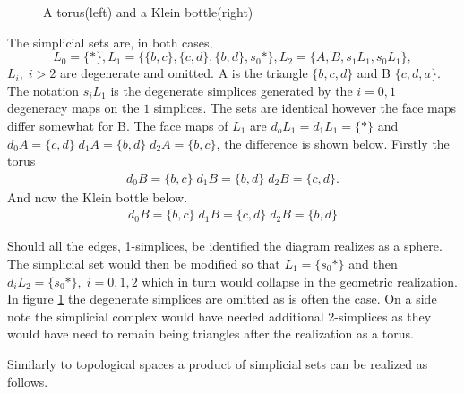\documentclass[../../main.tex]{subfiles}
\begin{document}
\begin{example}
\begin{figure}[H]
\begin{subfigure}[b]{0.3\textwidth}
        \end{subfigure}
        \caption{A torus(left) and a Klein bottle(right)}
        \label{fig:squares}
        \end{figure}
        The simplicial sets are, in both cases, 
        \[L_0=\{*\}, L_1=\{\{b,c\},\{c,d\},\{b,d\},s_0*\}, L_2=\{A,B,s_1L_1,s_0L_1\},\] $L_i,\; i>2$ are degenerate and omitted. A is the triangle $\{b,c,d\}$ and B $\{c,d,a\}$. The notation $s_iL_1$ is the degenerate simplices generated by the $i=0,1$ degeneracy maps on the $1$ simplices. The sets are identical however the face maps differ somewhat for B. The face maps of $L_1$ are $d_oL_1=d_1L_1=\{*\}$ and $d_0A=\{c,d\} \; d_1A = \{b,d\} \; d_2A=\{b,c\}$, the difference is shown below. Firstly the torus 
        \begin{align*}
            d_0B=\{b,c\} \; d_1B = \{b,d\} \; d_2B=\{c,d\}.
        \end{align*}
        And now the Klein bottle below.
        \begin{align*}
            d_0B=\{b,c\} \; d_1B = \{c,d\} \; d_2B=\{b,d\}
        \end{align*}

        Should all the edges, 1-simplices, be identified the diagram realizes as a sphere. The simplicial set would then be modified so that $L_1=\{s_0*\}$ and then $d_iL_2=\{s_0*\},\; i=0,1,2$ which in turn would collapse in the geometric realization. In figure \ref{fig:squares} the degenerate simplices are omitted as is often the case. On a side note the simplicial complex would have needed additional 2-simplices as they would have need to remain being triangles after the realization as a torus.
    \end{example}

    Similarly to topological spaces a product of simplicial sets can be realized as follows.
\end{document}
